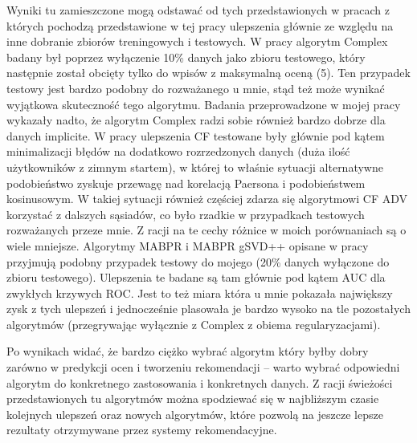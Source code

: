 \documentclass{pracamgr}
\begin{document}
    Wyniki tu zamieszczone mogą odstawać od tych przedstawionych w pracach z których pochodzą przedstawione w tej pracy ulepszenia głównie ze względu na inne 
    dobranie zbiorów treningowych i testowych.\newline
    W pracy \cite{205} algorytm Complex badany był poprzez wyłączenie 10\% danych jako zbioru testowego, który następnie został obcięty tylko do wpisów z
    maksymalną oceną (5). Ten przypadek testowy jest bardzo podobny do rozważanego u mnie, stąd też może wynikać wyjątkowa skuteczność tego algorytmu.
    Badania przeprowadzone w mojej pracy wykazały nadto, że algorytm Complex radzi sobie również bardzo dobrze dla danych implicite.\newline
    W pracy \cite{221} ulepszenia CF testowane były głównie pod kątem minimalizacji błędów na dodatkowo rozrzedzonych danych
    (duża ilość użytkowników z zimnym startem), w której to właśnie sytuacji alternatywne podobieństwo zyskuje przewagę nad korelacją Paersona
    i podobieństwem kosinusowym. W takiej sytuacji również częściej zdarza się algorytmowi CF ADV korzystać z dalszych sąsiadów, co było rzadkie 
    w przypadkach testowych rozważanych przeze mnie. Z racji na te cechy różnice w moich porównaniach są o wiele mniejsze.\newline
    Algorytmy MABPR i MABPR gSVD++ opisane w pracy \cite{191} przyjmują podobny przypadek testowy do mojego (20\% danych wyłączone do zbioru testowego).
    Ulepszenia te badane są tam głównie pod kątem AUC dla zwykłych krzywych ROC. Jest to też miara która u mnie pokazała największy zysk z tych ulepszeń
    i jednocześnie plasowała je bardzo wysoko na tle pozostałych algorytmów (przegrywając wyłącznie z Complex z obiema regularyzacjami).\newline
    
    Po wynikach widać, że bardzo ciężko wybrać algorytm który byłby dobry zarówno w predykcji ocen i tworzeniu rekomendacji -- warto wybrać odpowiedni algorytm
    do konkretnego zastosowania i konkretnych danych.
    Z racji świeżości przedstawionych tu algorytmów można spodziewać się w najbliższym czasie kolejnych ulepszeń oraz nowych algorytmów,
    które pozwolą na jeszcze lepsze rezultaty otrzymywane przez systemy rekomendacyjne.
    
\end{document}
